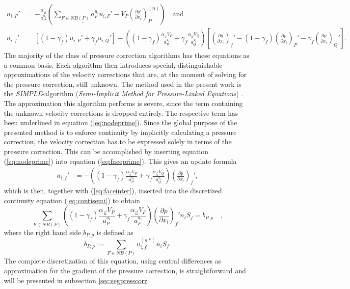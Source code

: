 \begin{align}
  \label{eq:nodeprime}
  u_{i,P}' 
  &=  
  - \frac{\alpha_{\vec{u}}}{a_P^{u_i}} \left(\underline{\sum_{F \in NB(P)} a_F^{u_i} u_{i,F}'}
  - V_P\left(\frac{\partial p'}{\partial x_i}\right)_P^{(n)} \right) \quad \text{and}\\[1em]
  \label{eq:faceprime}
  u_{i,f}' 
  &= 
  \left[\left(1 - \gamma_f\right) u_{i,P}' + \gamma_f u_{i,Q}' \right] 
  - 
  \left(\left(1 - \gamma_f\right) \frac{\alpha_\vec{u} V_P}{a_P^{u_i}} + \gamma_f \frac{\alpha_\vec{u} V_Q}{a_Q^{u_i}}\right)
  \left[ 
  \left(\frac{\partial p}{\partial x_i}\right)_f' 
  - \left( 1 - \gamma_f \right) \left( \frac{\partial p}{\partial x_i} \right)_P' 
  - \gamma_f \left(\frac{\partial p}{\partial x_i}\right)_Q' 
  \right].
\end{align}
The majority of the class of pressure correction algorithms has these equations as a common basis. Each algorithm then introduces special, distinguishable approximations of the velocity corrections that are, at the moment of solving for the pressure correction, still unknown. The method used in the present work is the \emph{SIMPLE}-algorithm (\emph{Semi-Implicit Method for Pressure-Linked Equations}) \cite{patankar72}. The approximation this algorithm performs is severe, since the term containing the unknown velocity corrections is dropped entirely. The respective term has been underlined in equation (\ref{eq:nodeprime}). Since the global purpose of the presented method is to enforce continuity by implicitly calculating a pressure correction, the velocity correction has to be expressed solely in terms of the pressure correction. This can be accomplished by inserting equation (\ref{eq:nodeprime}) into equation (\ref{eq:faceprime}). This gives an update formula
\begin{align}
  \label{eq:velcorr}
  u_{i,f}' 
  &= 
  - \left(\left(1 - \gamma_f\right) \frac{\alpha_\vec{u} V_P}{a_P^{u_i}} + \gamma_f \frac{\alpha_\vec{u} V_Q}{a_Q^{u_i}}\right)
  \left(\frac{\partial p}{\partial x_i}\right)_f',
\end{align}
which is then, together with (\ref{eq:faceinter}), inserted into the discretized continuity equation (\ref{eq:contisemi}) to obtain
\begin{equation}
  \label{eq:presscorr}
  \sum_{F \in NB(P)} \left(\left(1 - \gamma_f\right) \frac{\alpha_\vec{u} V_P}{a_P^{u_i}} + \gamma_f \frac{\alpha_\vec{u} V_F}{a_F^{u_i}}\right)
  \left(\frac{\partial p}{\partial x_i}\right)_f' n_i S_f
  = b_{P,p}
  \quad,
\end{equation}
where the right hand side \(b_{P,p}\) is defined as
\begin{equation}
  \label{eq:presscorrb}
  b_{P,p} := \sum_{F \in NB(P)} u_{i,f}^{(n*)} n_i S_f.
\end{equation}
The complete discretization of this equation, using central differences as approximation for the gradient of the pressure correction, is straightforward and will be presented in subsection \ref{sec:segpresscorr}.


